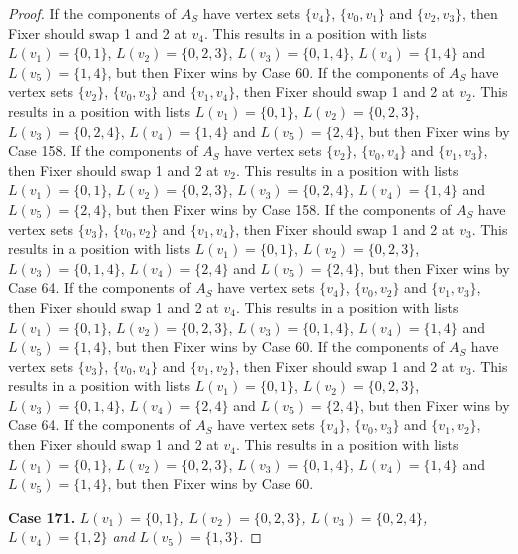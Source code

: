 \documentclass[12pt]{amsart}
\theoremstyle{plain}
\theoremstyle{definition}
\theoremstyle{remark}
\begin{document}
\begin{proof}
If the components of $A_S$ have vertex sets $\{v_4\}$, $\{v_0, v_1\}$ and $\{v_2, v_3\}$, then Fixer should swap 1 and 2 at $v_4$. This results in a position with lists $L(v_1) = \{0, 1\}$, $L(v_2) = \{0, 2, 3\}$, $L(v_3) = \{0, 1, 4\}$, $L(v_4) = \{1, 4\}$ and $L(v_5) = \{1, 4\}$, but then Fixer wins by Case 60.
If the components of $A_S$ have vertex sets $\{v_2\}$, $\{v_0, v_3\}$ and $\{v_1, v_4\}$, then Fixer should swap 1 and 2 at $v_2$. This results in a position with lists $L(v_1) = \{0, 1\}$, $L(v_2) = \{0, 2, 3\}$, $L(v_3) = \{0, 2, 4\}$, $L(v_4) = \{1, 4\}$ and $L(v_5) = \{2, 4\}$, but then Fixer wins by Case 158.
If the components of $A_S$ have vertex sets $\{v_2\}$, $\{v_0, v_4\}$ and $\{v_1, v_3\}$, then Fixer should swap 1 and 2 at $v_2$. This results in a position with lists $L(v_1) = \{0, 1\}$, $L(v_2) = \{0, 2, 3\}$, $L(v_3) = \{0, 2, 4\}$, $L(v_4) = \{1, 4\}$ and $L(v_5) = \{2, 4\}$, but then Fixer wins by Case 158.
If the components of $A_S$ have vertex sets $\{v_3\}$, $\{v_0, v_2\}$ and $\{v_1, v_4\}$, then Fixer should swap 1 and 2 at $v_3$. This results in a position with lists $L(v_1) = \{0, 1\}$, $L(v_2) = \{0, 2, 3\}$, $L(v_3) = \{0, 1, 4\}$, $L(v_4) = \{2, 4\}$ and $L(v_5) = \{2, 4\}$, but then Fixer wins by Case 64.
If the components of $A_S$ have vertex sets $\{v_4\}$, $\{v_0, v_2\}$ and $\{v_1, v_3\}$, then Fixer should swap 1 and 2 at $v_4$. This results in a position with lists $L(v_1) = \{0, 1\}$, $L(v_2) = \{0, 2, 3\}$, $L(v_3) = \{0, 1, 4\}$, $L(v_4) = \{1, 4\}$ and $L(v_5) = \{1, 4\}$, but then Fixer wins by Case 60.
If the components of $A_S$ have vertex sets $\{v_3\}$, $\{v_0, v_4\}$ and $\{v_1, v_2\}$, then Fixer should swap 1 and 2 at $v_3$. This results in a position with lists $L(v_1) = \{0, 1\}$, $L(v_2) = \{0, 2, 3\}$, $L(v_3) = \{0, 1, 4\}$, $L(v_4) = \{2, 4\}$ and $L(v_5) = \{2, 4\}$, but then Fixer wins by Case 64.
If the components of $A_S$ have vertex sets $\{v_4\}$, $\{v_0, v_3\}$ and $\{v_1, v_2\}$, then Fixer should swap 1 and 2 at $v_4$. This results in a position with lists $L(v_1) = \{0, 1\}$, $L(v_2) = \{0, 2, 3\}$, $L(v_3) = \{0, 1, 4\}$, $L(v_4) = \{1, 4\}$ and $L(v_5) = \{1, 4\}$, but then Fixer wins by Case 60.

\noindent\textbf{Case 171.  }\textit{$L(v_1) = \{0, 1\}$, $L(v_2) = \{0, 2, 3\}$, $L(v_3) = \{0, 2, 4\}$, $L(v_4) = \{1, 2\}$ and $L(v_5) = \{1, 3\}$.}


\end{proof}
\end{document}
